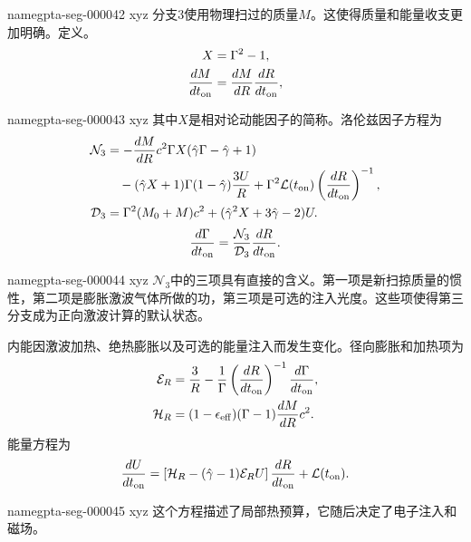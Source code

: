 \documentclass[twocolumn]{aastex702}
\makeatletter
\providecommand{\gptareaderanchor}[1]{\pdfdest name{#1} xyz}%
\providecommand{\gptareaderanchor}[1]{\special{pdf:dest (#1) [ @thispage /XYZ @xpos @ypos null ]}}%
\makeatother
\begin{document}
\gptareaderanchor{gpta-seg-000042}%
分支3使用物理扫过的质量\(M\)。这使得质量和能量收支更加明确。定义。
\begin{equation}
\begin{aligned}
X &= \Gamma^2-1,\\
\frac{dM}{dt_{\rm on}} &= \frac{dM}{dR}\frac{dR}{dt_{\rm on}},
\end{aligned}
\end{equation}

\gptareaderanchor{gpta-seg-000043}%
其中\(X\)是相对论动能因子的简称。洛伦兹因子方程为
\begin{equation}
\begin{aligned}
\mathcal{N}_3&=
-\frac{dM}{dR}c^2\Gamma X
(\hat{\gamma}\Gamma-\hat{\gamma}+1)
\\
&\quad
-(\hat{\gamma}X+1)\Gamma(1-\hat{\gamma})
\frac{3U}{R}
+\Gamma^2\mathcal{L}(t_{\rm on})
\left(\frac{dR}{dt_{\rm on}}\right)^{-1},
\\
\mathcal{D}_3&=
\Gamma^2(M_0+M)c^2
+(\hat{\gamma}^2X+3\hat{\gamma}-2)U .
\end{aligned}
\end{equation}
\begin{equation}
\frac{d\Gamma}{dt_{\rm on}}=
\frac{\mathcal{N}_3}{\mathcal{D}_3}\frac{dR}{dt_{\rm on}}.
\end{equation}

\gptareaderanchor{gpta-seg-000044}%
\(\mathcal{N}_3\)中的三项具有直接的含义。第一项是新扫掠质量的惯性，第二项是膨胀激波气体所做的功，第三项是可选的注入光度。这些项使得第三分支成为正向激波计算的默认状态。

内能因激波加热、绝热膨胀以及可选的能量注入而发生变化。径向膨胀和加热项为
\begin{equation}
\begin{aligned}
\mathcal{E}_R &=
\frac{3}{R}
-\frac{1}{\Gamma}
\left(\frac{dR}{dt_{\rm on}}\right)^{-1}
\frac{d\Gamma}{dt_{\rm on}},\\
\mathcal{H}_R &=(1-\epsilon_{\rm eff})(\Gamma-1)
\frac{dM}{dR}c^2 .
\end{aligned}
\end{equation}
能量方程为
\begin{equation}
\frac{dU}{dt_{\rm on}}=
\left[\mathcal{H}_R-(\hat{\gamma}-1)\mathcal{E}_R U\right]
\frac{dR}{dt_{\rm on}}
+\mathcal{L}(t_{\rm on}).
\end{equation}

\gptareaderanchor{gpta-seg-000045}%
这个方程描述了局部热预算，它随后决定了电子注入和磁场。
\end{document}
